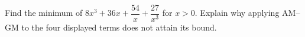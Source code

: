 Find the minimum of $8x^3+36x+\dfrac{54}{x}+\dfrac{27}{x^3}$ for $x>0$. Explain why applying AM--GM to the four displayed terms does not attain its bound.
